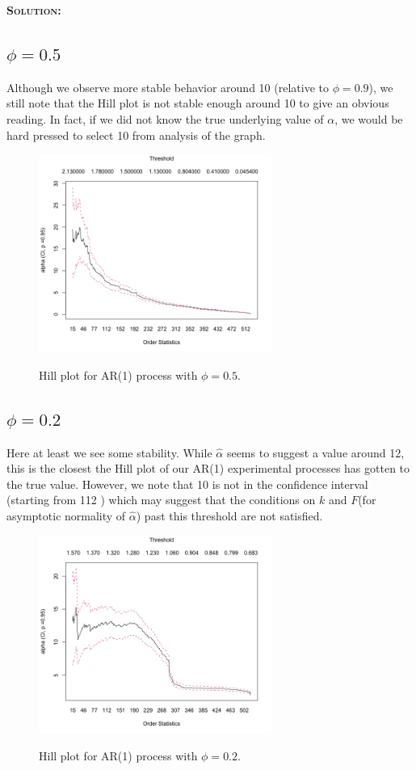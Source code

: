 \documentclass[12pt,oneside]{article}
\newenvironment{solution}
    {\textbf{\textsc{Solution:}}\\}
    {\newpage}
\begin{document}
\begin{solution}
\subsection*{$\phi=0.5$}
Although we observe more stable behavior around 10 (relative to $\phi=0.9$), we still note that the Hill plot is not stable enough around 10 to give an obvious reading. In fact, if we did not know the true underlying value of $\alpha$, we would be hard pressed to select 10 from analysis of the graph.
\begin{figure}[H]
\begin{center}
{\includegraphics[width=3in]{Assignments/a3/hill-plot-ar5.png}}
\caption{Hill plot for AR(1) process with $\phi=0.5$.}
\end{center}
\end{figure}

\subsection*{$\phi=0.2$}
Here at least we see some stability. While $\hat\alpha$ seems to suggest a value around 12, this is the closest the Hill plot of our AR(1) experimental processes has gotten to the true value. However, we note that 10 is not in the confidence interval (starting from 112 ) which may suggest that the conditions on $k$ and $F$(for asymptotic normality of $\hat\alpha$) past this threshold are not satisfied.
\begin{figure}[H]
\begin{center}
{\includegraphics[width=3in]{Assignments/a3/hill-plot-ar2.png}}
\caption{Hill plot for AR(1) process with $\phi=0.2$.}
\end{center}
\end{figure}
\end{solution}
\end{document}
